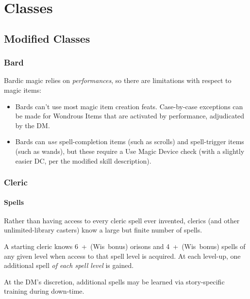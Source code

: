 
\chapter{Classes}
\label{sect-classes}

\section{Modified Classes}

%
\subsection{Bard}

Bardic magic relies on \textit{performances}, so there are limitations with
respect to magic items:

\begin{itemize}
\item Bards can't use most magic item creation feats. Case-by-case exceptions
can be made for Wondrous Items that are activated by performance, adjudicated
by the DM.
\item Bards can \textit{use} spell-completion items (such as scrolls) and
spell-trigger items (such as wands), but these require a Use Magic Device
check (with a slightly easier DC, per the modified skill description).
\end{itemize}
%

%
\subsection{Cleric}

\subsubsection{Spells}

Rather than having access to every cleric spell ever invented, clerics
(and other unlimited-library casters) know a large but finite number of
spells.

A starting cleric knows 6~+~(Wis~bonus) orisons and 4~+~(Wis~bonus)
spells of any given level when access to that spell level is acquired.
At each level-up, one additional spell \textit{of each spell level} is
gained.

At the DM's discretion, additional spells may be learned via story-specific
training during down-time.

